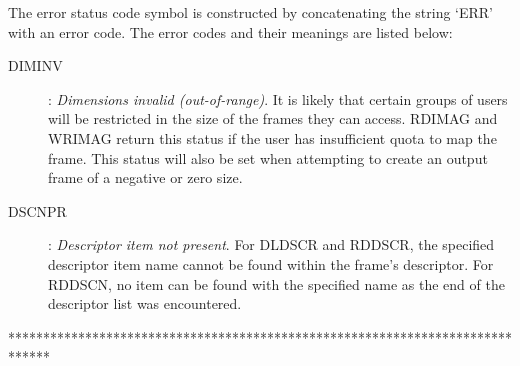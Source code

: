 \documentclass[twoside,11pt]{article}
\renewcommand{\_}{\texttt{\symbol{95}}}
\begin{document}
The error status code symbol is constructed by concatenating the string
`ERR\_' with an error code.
The error codes and their meanings are listed below:
\begin{description}
  \item [DIMINV]:
  \emph{Dimensions invalid (out-of-range)}.
  It is likely that certain groups of users will be restricted in the size of the
  frames they can access.
  RDIMAG and WRIMAG return this status if the user has insufficient quota to map
  the frame.
  This status will also be set when attempting to create an output frame of a
  negative or zero size.
  \item [DSCNPR]:
  \emph{Descriptor item not present}.
  For DLDSCR and RDDSCR, the specified descriptor item name cannot be found within
  the frame's descriptor.
  For RDDSCN, no item can be found with the specified name as the end of the
  descriptor list was encountered.
\end{description}

******************************************************************************
\end{document}
